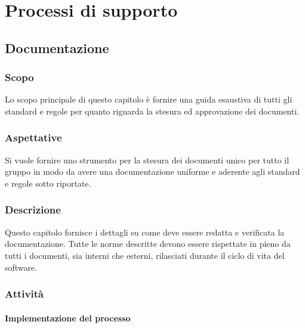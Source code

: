 \section{Processi di supporto}

	\subsection{Documentazione}

		\subsubsection{Scopo}
			Lo scopo principale di questo capitolo è fornire una guida esaustiva di tutti gli standard e regole per quanto riguarda la stesura ed approvazione dei documenti.
		\subsubsection{Aspettative}
			Si vuole fornire uno strumento per la stesura dei documenti unico per tutto il gruppo in modo da avere una documentazione uniforme e aderente agli standard e regole sotto riportate.
		\subsubsection{Descrizione}
			Questo capitolo fornisce i dettagli su come deve essere redatta e verificata la documentazione. Tutte le norme descritte devono essere rispettate in pieno da tutti i documenti, sia interni che esterni, rilasciati durante il ciclo di vita del software.

		\subsubsection{Attività}
			\paragraph{Implementazione del processo}

